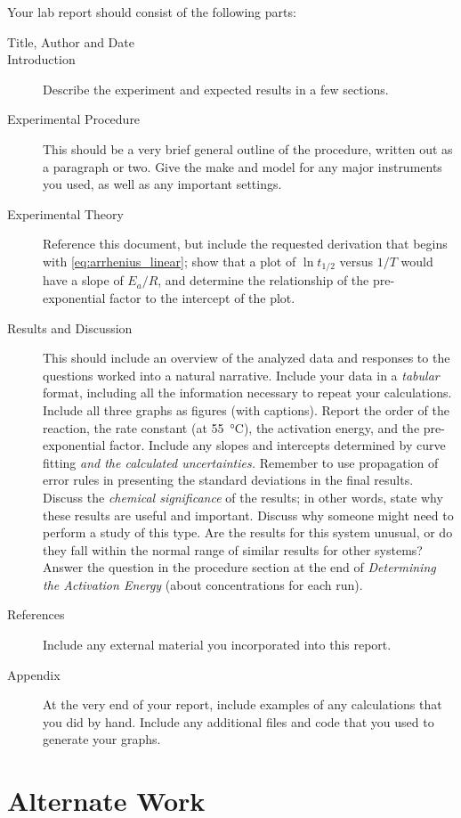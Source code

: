 Your lab report should consist of the following parts:
\begin{description}
	\item[Title, Author and Date]
	\item[Introduction] Describe the experiment and expected results in a few sections. 
	\item[Experimental Procedure] This should be a very brief general outline of the procedure, written out as a paragraph or two. 
	Give the make and model for any major instruments you used, as well as any important settings.
	\item[Experimental Theory] Reference this document, but include the requested derivation that begins with \cref{eq:arrhenius_linear}; show that a plot of \(\ln{t_{1/2}}\) versus \(1/T\) would have a slope of \(E_a/R\), and determine the relationship of the pre-exponential factor to the intercept of the plot. 
	\item[Results and Discussion] This should include an overview of the analyzed data and responses to the questions worked into a natural narrative. 
	Include your data in a \emph{tabular} format, including all the information necessary to repeat your calculations. 
	Include all three graphs as figures (with captions). 
	Report the order of the reaction, the rate constant (at \qty{55}{\celsius}), the activation energy, and the pre-exponential factor. 
	Include any slopes and intercepts determined by curve fitting \emph{and the calculated uncertainties.} 
	Remember to use propagation of error rules in presenting the standard deviations in the final results. 
	Discuss the \emph{chemical significance} of the results; in other words, state why these results are useful and important. 
	Discuss why someone might need to perform a study of this type. 
	Are the results for this system unusual, or do they fall within the normal range of similar results for other systems?
	Answer the question in the procedure section at the end of \emph{Determining the Activation Energy} (about concentrations for each run). 
	\item[References] Include any external material you incorporated into this report. 
	\item[Appendix] At the very end of your report, include examples of any calculations that you did by hand. 
	Include any additional files and code that you used to generate your graphs.
\end{description}


\section{Alternate Work}

